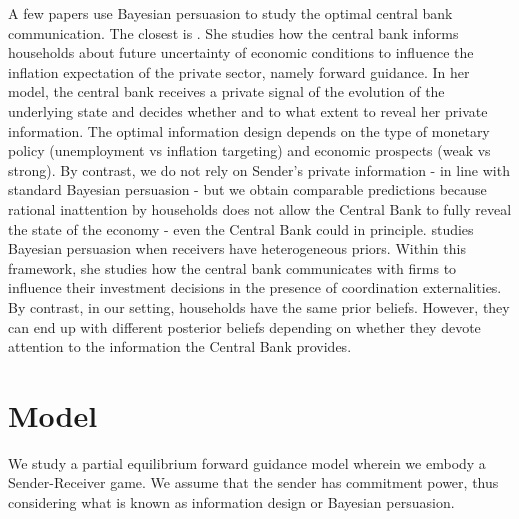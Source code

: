 \documentclass[12pt,a4paper]{article}
\begin{document}
A few papers use Bayesian persuasion to study the optimal central bank communication. The closest is \cite{Ko2022}. She studies how the central bank informs households about future uncertainty of economic conditions to influence the inflation expectation of the private sector, namely forward guidance. In her model, the central bank receives a private signal of the evolution of the underlying state and decides whether and to what extent to reveal her private information. The optimal information design depends on the type of monetary policy (unemployment vs inflation targeting) and economic prospects (weak vs strong). By contrast, we do not rely on Sender's private information - in line with standard Bayesian persuasion - but we obtain comparable predictions because rational inattention by households does not allow the Central Bank to fully reveal the state of the economy - even the Central Bank could in principle.
\cite{Herbert2021} studies Bayesian persuasion when receivers have heterogeneous priors. Within this framework, she studies how the central bank communicates with firms to influence their investment decisions in the presence of coordination externalities. By contrast, in our setting, households have the same prior beliefs. However, they can end up with different posterior beliefs depending on whether they devote attention to the information the Central Bank provides.

\section{Model} \label{sec:model}

We study a partial equilibrium forward guidance model wherein we embody a Sender-Receiver game. We assume that the sender has commitment power, thus considering what is known as information design or Bayesian persuasion. 
\end{document}
